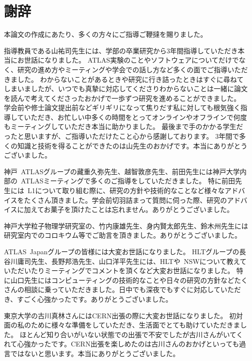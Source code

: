 \chapter*{謝辞}

本論文の作成にあたり、多くの方々にご指導ご鞭撻を賜りました。

指導教員である山\ajTatsuSaki 祐司先生には、学部の卒業研究から3年間指導していただき本当にお世話になりました。
ATLAS実験のことやソフトウェアについてだけでなく、研究の進め方やミーティングや学会での話し方など多くの面でご指導いただきました。
わからないことがあるときや研究に行き詰ったときはすぐに尋ねてしまいましたが、いつでも真摯に対応してくださりわからないことは一緒に論文を読んで考えてくださったおかげで一歩ずつ研究を進めることができました。
学会前や修士論文提出前などギリギリになって焦りだす私に対しても根気強く指導していただき、お忙しい中多くの時間をとってオンラインやオフラインで何度もミーティングしていただき本当に助かりました。
最後まで手のかかる学生だったと思いますが、ご指導いただけたこと心から感謝しております。
3年間で多くの知識と技術を得ることができたのは山\ajTatsuSaki 先生のおかげです。本当にありがとうございました。

神戸~ATLASグループの藏重久弥先生、越智敦彦先生、前田先生には神戸大学内部の~ATLASミーティングで多くのご指導をしていただきました。
特に前田先生には~L1について取り組む際に、研究の方針や技術的なことなど様々なアドバイスをたくさん頂きました。学会前切羽詰まって質問に伺った際、研究のアドバイスに加えてお菓子を頂けたことは忘れません。ありがとうございました。

神戸大学粒子物理学研究室の、竹内康雄先生、身内賢太郎先生、鈴木州先生には研究室内でのコロキウム等でご助言を頂きました。ありがとうございました。

ATLAS~Japanグループの皆様には大変お世話になりました。
HLTグループの長谷川庸司先生、長野邦浩先生、山口洋平先生には、HLTや~NSWについて教えていただいたりミーティングでコメントを頂くなど大変お世話になりました。
特に山口先生にはコンピューティングの技術的なことや日々の研究の方針などたくさんの相談に乗っていただきました。日中でも深夜でもすぐに対応していただき、すごく心強かったです。ありがとうございました。

東京大学の古川真林さんにはCERN出張の際に大変お世話になりました。
初対面の私のために様々な準備をしていただき、生活面でとても助けていただきました。
ほとんど知り合いがいない状態での出張で不安でしたが古川さんがいてくれて心強かったです。CERN出張を楽しめたのは古川さんのおかげといっても過言ではないと思います。本当にありがとうございました。

